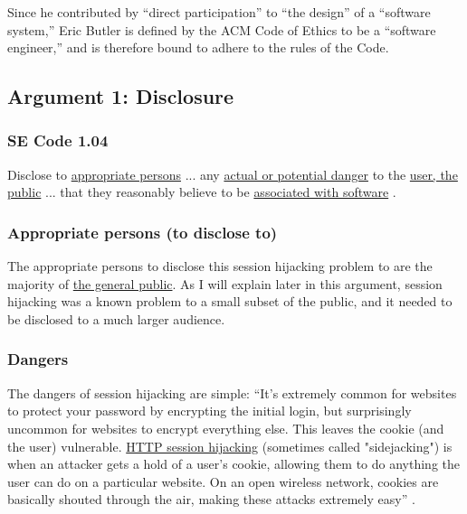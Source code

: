 \documentclass[11pt]{article}
\begin{document}
\begin{multicols}{2}
Since he contributed by ``direct participation'' to ``the design'' of a ``software system,'' Eric Butler is defined by the ACM Code of Ethics to be a ``software engineer,'' and is therefore bound to adhere to the rules of the Code\cite{se-code}.




\subsection{Argument 1: Disclosure}
\subsubsection{SE Code 1.04}
Disclose to \uline{appropriate persons} ... any \uline{actual or potential danger} to the \uline{user, the public} ... that they reasonably believe to be \uline{associated with software} \cite{se-code}. 

\subsubsection{Appropriate persons (to disclose to)}
The appropriate persons to disclose this session hijacking problem to are the majority of \uline{the general public}. As I will explain later in this argument, session hijacking was a known problem to a small subset of the public, and it needed to be disclosed to a much larger audience.

\subsubsection{Dangers}
The dangers of session hijacking are simple: ``It's extremely common for websites to protect your password by encrypting the initial login, but surprisingly uncommon for websites to encrypt everything else. This leaves the cookie (and the user) vulnerable. \uline{HTTP session hijacking} (sometimes called "sidejacking") is when an attacker gets a hold of a user's cookie, allowing them to do anything the user can do on a particular website. On an open wireless network, cookies are basically shouted through the air, making these attacks extremely easy'' \cite{eric-butler}.


\end{multicols}
\end{document}
